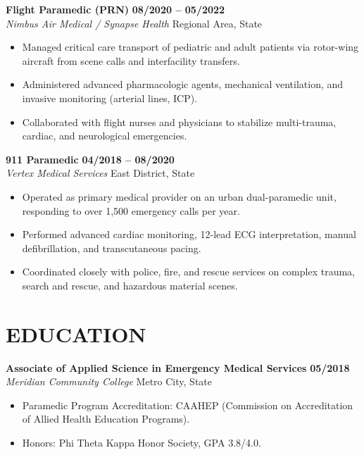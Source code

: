 \documentclass[10pt,letterpaper]{article}
\begin{document}
\noindent
\textbf{Flight Paramedic (PRN)} \hfill \textbf{08/2020 -- 05/2022} \\
\textit{Nimbus Air Medical / Synapse Health} \hfill Regional Area, State
\begin{itemize}[leftmargin=*,nosep,topsep=2pt,itemsep=2pt]
    \item Managed critical care transport of pediatric and adult patients via rotor-wing aircraft from scene calls and interfacility transfers.
    \item Administered advanced pharmacologic agents, mechanical ventilation, and invasive monitoring (arterial lines, ICP).
    \item Collaborated with flight nurses and physicians to stabilize multi-trauma, cardiac, and neurological emergencies.
\end{itemize}

\vspace{6pt}

\noindent
\textbf{911 Paramedic} \hfill \textbf{04/2018 -- 08/2020} \\
\textit{Vertex Medical Services} \hfill East District, State
\begin{itemize}[leftmargin=*,nosep,topsep=2pt,itemsep=2pt]
    \item Operated as primary medical provider on an urban dual-paramedic unit, responding to over 1,500 emergency calls per year.
    \item Performed advanced cardiac monitoring, 12-lead ECG interpretation, manual defibrillation, and transcutaneous pacing.
    \item Coordinated closely with police, fire, and rescue services on complex trauma, search and rescue, and hazardous material scenes.
\end{itemize}

\section*{EDUCATION}
\noindent
\textbf{Associate of Applied Science in Emergency Medical Services} \hfill \textbf{05/2018} \\
\textit{Meridian Community College} \hfill Metro City, State
\begin{itemize}[leftmargin=*,nosep,topsep=2pt]
    \item Paramedic Program Accreditation: CAAHEP (Commission on Accreditation of Allied Health Education Programs).
    \item Honors: Phi Theta Kappa Honor Society, GPA 3.8/4.0.
\end{itemize}
\end{document}
